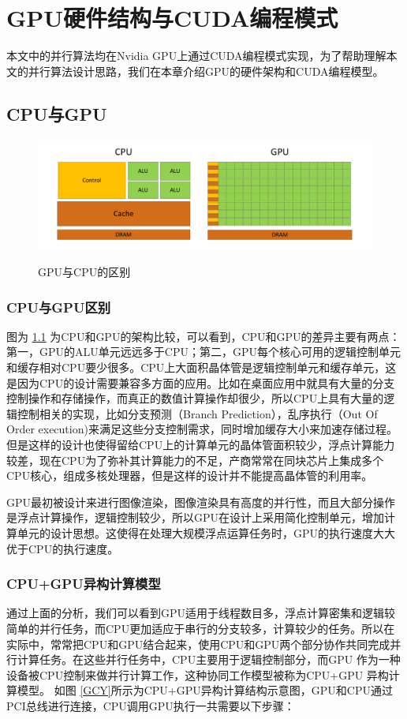 \chapter{GPU硬件结构与CUDA编程模式}
本文中的并行算法均在Nvidia GPU上通过CUDA编程模式实现，为了帮助理解本文的并行算法设计思路，我们在本章介绍GPU的硬件架构和CUDA编程模型。
\section{CPU与GPU}
\begin{figure}
\setlength{\abovecaptionskip}{-0.5cm}
\begin{center}
{\includegraphics[width=1 \textwidth]{figures/GPU&CPU.pdf}}
\end{center}
\caption{{\footnotesize{GPU与CPU的区别}}}
\label{GCD}
\end{figure}
\subsection{CPU与GPU区别}

图为 \ref{GCD} 为CPU和GPU的架构比较，可以看到，CPU和GPU的差异主要有两点：第一，GPU的ALU单元远远多于CPU；第二，GPU每个核心可用的逻辑控制单元和缓存相对CPU要少很多。CPU上大面积晶体管是逻辑控制单元和缓存单元，这是因为CPU的设计需要兼容多方面的应用。比如在桌面应用中就具有大量的分支控制操作和存储操作，而真正的数值计算操作却很少，所以CPU上具有大量的逻辑控制相关的实现，比如分支预测（Branch Prediction），乱序执行（Out Of Order execution)来满足这些分支控制需求，同时增加缓存大小来加速存储过程。但是这样的设计也使得留给CPU上的计算单元的晶体管面积较少，浮点计算能力较差，现在CPU为了弥补其计算能力的不足，产商常常在同块芯片上集成多个CPU核心，组成多核处理器，但是这样的设计并不能提高晶体管的利用率。

GPU最初被设计来进行图像渲染，图像渲染具有高度的并行性，而且大部分操作是浮点计算操作，逻辑控制较少，所以GPU在设计上采用简化控制单元，增加计算单元的设计思想。这使得在处理大规模浮点运算任务时，GPU的执行速度大大优于CPU的执行速度。
\subsection{CPU+GPU异构计算模型}
通过上面的分析，我们可以看到GPU适用于线程数目多，浮点计算密集和逻辑较简单的并行任务，而CPU更加适应于串行的分支较多，计算较少的任务。所以在实际中，常常把CPU和GPU结合起来，使用CPU和GPU两个部分协作共同完成并行计算任务。在这些并行任务中，CPU主要用于逻辑控制部分，而GPU 作为一种设备被CPU控制来做并行计算工作，这种协同工作模型被称为CPU+GPU 异构计算模型。
如图 \ref{GCY}所示为CPU+GPU异构计算结构示意图，GPU和CPU通过PCI总线进行连接，CPU调用GPU执行一共需要以下步骤：

